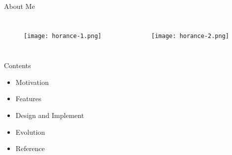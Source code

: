 \begin{frame}
  \titlepage
\end{frame}

\begin{frame}{About Me}
  \begin{columns}
    \begin{figure}
      \centering
      \texttt{[image: horance-1.png]}
    \end{figure}

    \begin{figure}
      \centering
      \texttt{[image: horance-2.png]}
    \end{figure}
  \end{columns}
\end{frame}

\begin{frame}{Contents}
    \begin{itemize}
    \item \alert{Motivation}
    \item \alert{Features}
    \item \alert{Design and Implement}
    \item \alert{Evolution}
    \item \alert{Reference}    
    \end{itemize}
\end{frame}